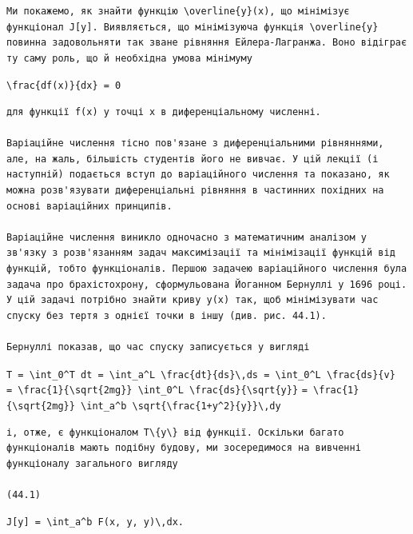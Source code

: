 \documentclass[
  ukrainian,
]{article}
\begin{document}
\begin{verbatim}
Ми покажемо, як знайти функцію \overline{y}(x), що мінімізує функціонал J[y]. Виявляється, що мінімізуюча функція \overline{y} повинна задовольняти так зване рівняння Ейлера-Лагранжа. Воно відіграє ту саму роль, що й необхідна умова мінімуму
\end{verbatim}

\texttt{\textbackslash{}frac\{df(x)\}\{dx\}\ =\ 0}

\begin{verbatim}
для функції f(x) у точці x в диференціальному численні.

Варіаційне числення тісно пов'язане з диференціальними рівняннями, але, на жаль, більшість студентів його не вивчає. У цій лекції (і наступній) подається вступ до варіаційного числення та показано, як можна розв'язувати диференціальні рівняння в частинних похідних на основі варіаційних принципів.

Варіаційне числення виникло одночасно з математичним аналізом у зв'язку з розв'язанням задач максимізації та мінімізації функцій від функцій, тобто функціоналів. Першою задачею варіаційного числення була задача про брахістохрону, сформульована Йоганном Бернуллі у 1696 році. У цій задачі потрібно знайти криву y(x) так, щоб мінімізувати час спуску без тертя з однієї точки в іншу (див. рис. 44.1).

Бернуллі показав, що час спуску записується у вигляді
\end{verbatim}

\texttt{T\ =\ \textbackslash{}int\_0\^{}T\ dt\ =\ \textbackslash{}int\_a\^{}L\ \textbackslash{}frac\{dt\}\{ds\}\textbackslash{},ds\ =\ \textbackslash{}int\_0\^{}L\ \textbackslash{}frac\{ds\}\{v\}}
\texttt{=\ \textbackslash{}frac\{1\}\{\textbackslash{}sqrt\{2mg\}\}\ \textbackslash{}int\_0\^{}L\ \textbackslash{}frac\{ds\}\{\textbackslash{}sqrt\{y\}\}}
\texttt{=\ \textbackslash{}frac\{1\}\{\textbackslash{}sqrt\{2mg\}\}\ \textbackslash{}int\_a\^{}b\ \textbackslash{}sqrt\{\textbackslash{}frac\{1+y\textquotesingle{}\^{}2\}\{y\}\}\textbackslash{},dy}

\begin{verbatim}
і, отже, є функціоналом T\{y\} від функції. Оскільки багато функціоналів мають подібну будову, ми зосередимося на вивченні функціоналу загального вигляду

(44.1)
\end{verbatim}

\texttt{J{[}y{]}\ =\ \textbackslash{}int\_a\^{}b\ F(x,\ y,\ y\textquotesingle{})\textbackslash{},dx.}
\end{document}
